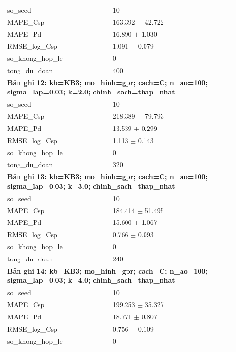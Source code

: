 \begin{longtable}{p{0.43\linewidth}p{0.50\linewidth}}
so\_\allowbreak seed & 10 \\
MAPE\_\allowbreak Csp & 163.392 $\pm$ 42.722 \\
MAPE\_\allowbreak Pd & 16.890 $\pm$ 1.030 \\
RMSE\_\allowbreak log\_\allowbreak Csp & 1.091 $\pm$ 0.079 \\
so\_\allowbreak khong\_\allowbreak hop\_\allowbreak le & 0 \\
tong\_\allowbreak du\_\allowbreak doan & 400 \\
\midrule
\multicolumn{2}{p{0.95\linewidth}}{\textbf{Bản ghi 12: kb=KB3; mo\_hinh=gpr; cach=C; n\_ao=100; sigma\_lap=0.03; k=2.0; chinh\_sach=thap\_nhat}} \\
so\_\allowbreak seed & 10 \\
MAPE\_\allowbreak Csp & 218.389 $\pm$ 79.793 \\
MAPE\_\allowbreak Pd & 13.539 $\pm$ 0.299 \\
RMSE\_\allowbreak log\_\allowbreak Csp & 1.113 $\pm$ 0.143 \\
so\_\allowbreak khong\_\allowbreak hop\_\allowbreak le & 0 \\
tong\_\allowbreak du\_\allowbreak doan & 320 \\
\midrule
\multicolumn{2}{p{0.95\linewidth}}{\textbf{Bản ghi 13: kb=KB3; mo\_hinh=gpr; cach=C; n\_ao=100; sigma\_lap=0.03; k=3.0; chinh\_sach=thap\_nhat}} \\
so\_\allowbreak seed & 10 \\
MAPE\_\allowbreak Csp & 184.414 $\pm$ 51.495 \\
MAPE\_\allowbreak Pd & 15.600 $\pm$ 1.067 \\
RMSE\_\allowbreak log\_\allowbreak Csp & 0.766 $\pm$ 0.093 \\
so\_\allowbreak khong\_\allowbreak hop\_\allowbreak le & 0 \\
tong\_\allowbreak du\_\allowbreak doan & 240 \\
\midrule
\multicolumn{2}{p{0.95\linewidth}}{\textbf{Bản ghi 14: kb=KB3; mo\_hinh=gpr; cach=C; n\_ao=100; sigma\_lap=0.03; k=4.0; chinh\_sach=thap\_nhat}} \\
so\_\allowbreak seed & 10 \\
MAPE\_\allowbreak Csp & 199.253 $\pm$ 35.327 \\
MAPE\_\allowbreak Pd & 18.771 $\pm$ 0.807 \\
RMSE\_\allowbreak log\_\allowbreak Csp & 0.756 $\pm$ 0.109 \\
so\_\allowbreak khong\_\allowbreak hop\_\allowbreak le & 0 \\

\end{longtable}
